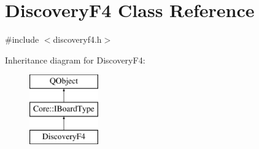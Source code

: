 \hypertarget{class_discovery_f4}{\section{Discovery\-F4 Class Reference}
\label{class_discovery_f4}
}


{\ttfamily \#include $<$discoveryf4.\-h$>$}

Inheritance diagram for Discovery\-F4\-:\begin{figure}[H]
\begin{center}
\leavevmode
\includegraphics[height=3.000000cm]{class_discovery_f4}
\end{center}
\end{figure}

